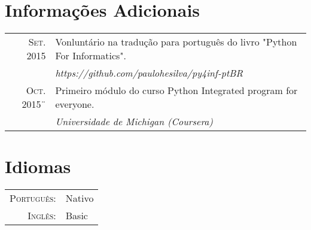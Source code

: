 \documentclass[a4paper,10pt]{article}
\begin{document}
\section{Informações Adicionais}
\begin{tabular}{rl}
\textsc{Set. 2015} & Vonluntário na tradução para português do livro "Python For Informatics".\normalsize\\ &\emph{https://github.com/paulohesilva/py4inf-ptBR}\\
\textsc{Oct. 2015}¨& Primeiro módulo do curso Python Integrated program for everyone.\normalsize\\
&\emph{Universidade de Michigan (Coursera)}\\
\end{tabular}

\section{Idiomas}
\begin{tabular}{rl}
 \textsc{Português:}&Nativo\\
\textsc{Inglês:}&Basic\\
\end{tabular}
\end{document}
